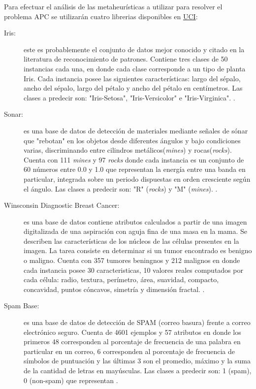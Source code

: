 \documentclass{ci5652}
\begin{document}
Para efectuar el análisis de las metaheurísticas a utilizar para resolver el
problema APC se utilizarán cuatro librerias disponibles en 
\href{http://archive.ics.uci.edu/ml/index.php}{UCI}:

\begin{description}
  \item [Iris:] este es probablemente el conjunto de datos mejor conocido y citado
  en la literatura de reconocimiento de patrones. Contiene tres clases de 50
  instancias cada una, en donde cada clase corresponde a un tipo de planta Iris.
  Cada instancia posee las siguientes características: largo del sépalo, ancho 
  del sépalo, largo del pétalo y ancho del pétalo en centímetros. Las clases a
  predecir son: "Iris-Setosa", "Iris-Versicolor" e "Iris-Virginica". 
  \cite{UCI_Iris}.
  
  \item [Sonar:] es una base de datos de detección de materiales mediante señales 
  de sónar que "rebotan" en los objetos desde diferentes ángulos y bajo 
  condiciones varias, discriminando entre cilindros metálicos(\textit{mines}) y
  rocas(\textit{rocks}). Cuenta con 111 \textit{mines} y 97 \textit{rocks} donde
  cada instancia es un conjunto de 60 números entre 0.0 y 1.0 que representan la
  energía entre una banda en particular, integrada sobre un periodo dispuestas 
  en orden cresciente según el ángulo. Las clases a predecir son: "R"
  (\textit{rocks}) y "M" (\textit{mines}). \cite{UCI_Sonar}.
   
  \item [Winsconsin Diagnostic Breast Cancer:] es una base de datos contiene
  atributos calculados a partir de una imagen digitalizada de una aspiración con
  aguja fina de una masa en la mama. Se describen las características de los
  núcleos de las células presentes en la imagen. La tarea consiste en determinar
  si un tumor encontrado es benigno o maligno. Cuenta con 357 tumores beningnos
  y 212 malignos en donde cada instancia posee 30 caracteristicas, 10 valores
  reales computados por cada célula: radio, textura, perímetro, área, suavidad,
  compacto, concavidad, puntos cóncavos, simetría y dimensión fractal.
  \cite{UCI_WDBC}.

  \item [Spam Base:] es una base de datos de detección de SPAM (correo basura)
  frente a correo electrónico seguro. Cuenta de 4601 ejemplos y 57 atributos en
  donde los primeros 48 corresponden al porcentaje de frecuencia de una palabra
  en particular en un correo, 6 corresponden al porcentaje de frecuencia de
  símbolos de puntuación y las últimas 3 son el promedio, máximo y la suma de la
  cantidad de letras en mayúsculas. Las clases a predecir son: 1 (spam), 0 
  (non-spam) que representan \cite{UCI_SpamBase}.
  
\end{description}
\end{document}
